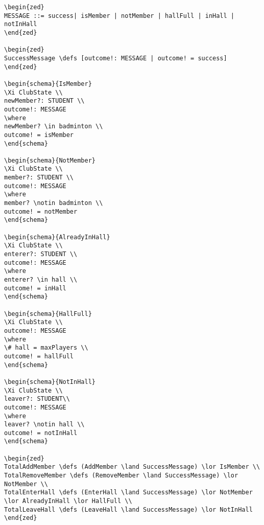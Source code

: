 \begin{verbatim}
\begin{zed}
MESSAGE ::= success| isMember | notMember | hallFull | inHall | notInHall
\end{zed}

\begin{zed}
SuccessMessage \defs [outcome!: MESSAGE | outcome! = success]
\end{zed}

\begin{schema}{IsMember}
\Xi ClubState \\
newMember?: STUDENT \\
outcome!: MESSAGE
\where
newMember? \in badminton \\
outcome! = isMember
\end{schema}

\begin{schema}{NotMember}
\Xi ClubState \\
member?: STUDENT \\
outcome!: MESSAGE
\where
member? \notin badminton \\
outcome! = notMember
\end{schema}

\begin{schema}{AlreadyInHall}
\Xi ClubState \\
enterer?: STUDENT \\
outcome!: MESSAGE
\where
enterer? \in hall \\
outcome! = inHall
\end{schema}

\begin{schema}{HallFull}
\Xi ClubState \\
outcome!: MESSAGE
\where
\# hall = maxPlayers \\
outcome! = hallFull
\end{schema}

\begin{schema}{NotInHall}
\Xi ClubState \\
leaver?: STUDENT\\
outcome!: MESSAGE
\where
leaver? \notin hall \\
outcome! = notInHall
\end{schema}

\begin{zed}
TotalAddMember \defs (AddMember \land SuccessMessage) \lor IsMember \\
TotalRemoveMember \defs (RemoveMember \land SuccessMessage) \lor NotMember \\
TotalEnterHall \defs (EnterHall \land SuccessMessage) \lor NotMember \lor AlreadyInHall \lor HallFull \\
TotalLeaveHall \defs (LeaveHall \land SuccessMessage) \lor NotInHall
\end{zed}


\end{verbatim}